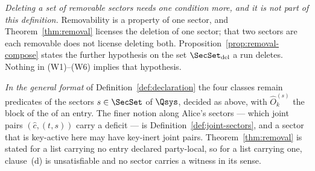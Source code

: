 \begin{definition}
\emph{Deleting a set of removable sectors needs one condition more, and it is
not part of this definition.} Removability is a property of one sector, and
Theorem~\ref{thm:removal} licenses the deletion of one sector; that two
sectors are each removable does not license deleting both.
Proposition~\ref{prop:removal-compose} states the further hypothesis on the
set $\SecSet_{\mathrm{del}}$ a run deletes.
Nothing in (W1)--(W6) implies that hypothesis.

\emph{In the general format} of Definition~\ref{def:declaration} the four
classes remain predicates of the sectors $s\in\SecSet$ of $\Qsys$, decided
as above, with $\hat O^{(s)}_k$ the block of the  of an
entry. The finer notion along Alice's sectors --- which joint
pairs $(\hat c,(t,s))$ carry a deficit --- is
Definition~\ref{def:joint-sectors}, and a sector that is key-active here may
have key-inert joint pairs. Theorem~\ref{thm:removal} is stated for a list
carrying no entry declared party-local, so for a list carrying one,
clause~(d) is unsatisfiable and no sector carries a witness in its sense.
\end{definition}
